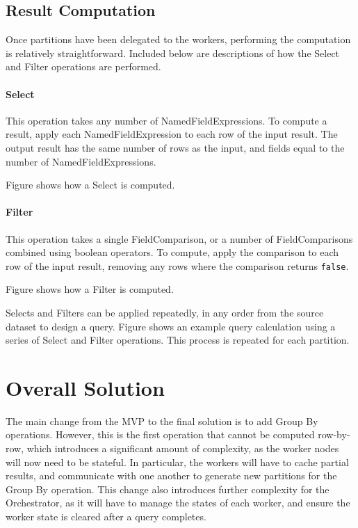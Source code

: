\subsection{Result Computation}
Once partitions have been delegated to the workers, performing the computation is relatively straightforward. Included below are descriptions of how the Select and Filter operations are performed.

\paragraph{Select} 
This operation takes any number of NamedFieldExpressions. To compute a result, apply each NamedFieldExpression to each row of the input result. The output result has the same number of rows as the input, and fields equal to the number of NamedFieldExpressions. 

Figure  shows how a Select is computed.


\paragraph{Filter}
This operation takes a single FieldComparison, or a number of FieldComparisons combined using boolean operators. To compute, apply the comparison to each row of the input result, removing any rows where the comparison returns \texttt{false}.

Figure  shows how a Filter is computed.


Selects and Filters can be applied repeatedly, in any order from the source dataset to design a query. Figure  shows an example query calculation using a series of Select and Filter operations. This process is repeated for each partition.

	
\section{Overall Solution}
The main change from the MVP to the final solution is to add Group By operations. However, this is the first operation that cannot be computed row-by-row, which introduces a significant amount of complexity, as the worker nodes will now need to be stateful. In particular, the workers will have to cache partial results, and communicate with one another to generate new partitions for the Group By operation. This change also introduces further complexity for the Orchestrator, as it will have to manage the states of each worker, and ensure the worker state is cleared after a query completes.

